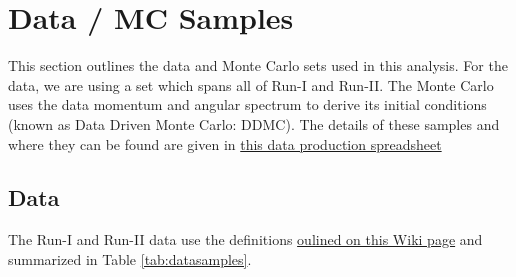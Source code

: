 \section{Data / MC Samples}\label{sec:DataSamples}

This section outlines the data and Monte Carlo sets used in this analysis. For the data, we are using a set which spans all of Run-I and Run-II. The Monte Carlo uses the data momentum and angular spectrum to derive its initial conditions (known as Data Driven Monte Carlo: DDMC). The details of these samples and where they can be found are given in \href{https://docs.google.com/spreadsheets/d/1_0kNCKBIIx53f6vopqN2OijtcTICHD9rDvN_YKGH2mI/edit?usp=sharing}{this data production spreadsheet}


\subsection{Data}\label{sec:data}

The Run-I and Run-II data use the definitions \href{https://redmine.fnal.gov/redmine/projects/lardbt/wiki/Recommended_SAM_Datasets}{oulined on this Wiki page} and summarized in Table \ref{tab:datasamples}.

